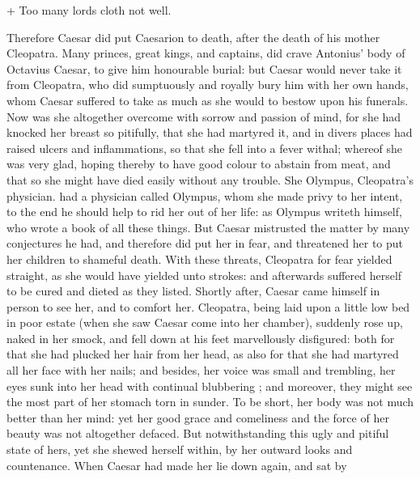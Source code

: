 \documentclass{book}
\begin{document}
\begin{versus}
\Locus \textus + 
Too many lords cloth not well.
\end{versus}
\noindent Therefore  Caesar
did put Caesarion to death, after the death of his mother Cleopatra.
Many princes, great kings, and captains, did crave Antonius' body of
Octavius Caesar, to give him honourable burial: but Caesar would never
take it from Cleopatra, 
who did sumptuously and royally bury him with her own hands, whom
Caesar suffered to take as much as she would to bestow upon his
funerals. Now was she altogether overcome with sorrow and passion
of mind, for she had knocked her breast so pitifully, that she
had martyred it, and in divers places had raised ulcers and
inflammations, so that she fell into a fever withal; whereof she was
very glad, hoping thereby to have good colour to abstain from meat,
and that so she might have died easily without any trouble. She \gloss
{Olympus, Cleopatra's physician.} had a physician called Olympus, whom
she made privy to her intent, to the end he should help to rid her
out of her life: as Olympus writeth himself, who wrote a book of all
these things. But Caesar mistrusted the matter by many conjectures
he had, and therefore did put her in fear, and threatened her to put
her children to shameful death. With these threats, Cleopatra for
fear yielded straight, as she would have yielded unto strokes: and
afterwards suffered herself to be cured and dieted as they listed.
Shortly  after, Caesar came
himself in person to see her, and to comfort her. Cleopatra,
being laid upon a little low bed in poor estate (when she saw Caesar
come into her chamber), suddenly rose up,
naked in her smock, and
fell down at his feet marvellously disfigured: both for that she had
plucked her hair from her head, as also for that she had martyred
all her face with her nails; and besides, her voice was small and
trembling, her eyes sunk into her head with continual blubbering ;
and moreover, they might see the most part of her stomach torn in
sunder. To be short, her body was not much better than her mind:
yet her good grace and comeliness and the force of her beauty was
not altogether defaced. But notwithstanding this ugly and pitiful
state of hers, yet she shewed herself within, by her outward looks
and countenance. When Caesar had made her lie down again, and sat by
\end{document}
